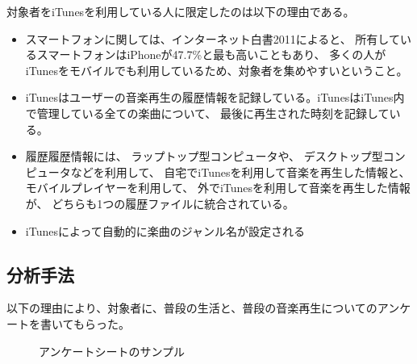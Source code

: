 \documentclass[a4paper, 11pt, onecolumn, report]{jsarticle}
\begin{document}
対象者をiTunesを利用している人に限定したのは以下の理由である。
\begin{itemize}
\item
スマートフォンに関しては、インターネット白書2011によると、
所有しているスマートフォンはiPhoneが47.7\%と最も高いこともあり、
多くの人がiTunesをモバイルでも利用しているため、対象者を集めやすいということ。
\item
iTunesはユーザーの音楽再生の履歴情報を記録している。iTunesはiTunes内で管理している全ての楽曲について、 最後に再生された時刻を記録している。
\item
履歴履歴情報には、
ラップトップ型コンピュータや、
デスクトップ型コンピュータなどを利用して、
自宅でiTunesを利用して音楽を再生した情報と、
モバイルプレイヤーを利用して、
外でiTunesを利用して音楽を再生した情報が、
どちらも1つの履歴ファイルに統合されている。
\item
iTunesによって自動的に楽曲のジャンル名が設定される
\end{itemize}

\subsection{分析手法}
以下の理由により、対象者に、普段の生活と、普段の音楽再生についてのアンケートを書いてもらった。

\begin{figure}[htbp]
\begin{center}
\caption{アンケートシートのサンプル}
\end{center}
\label{sheet_sample}
\end{figure}
\end{document}
